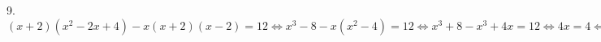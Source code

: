 9. $(x+2)(x^2-2x+4)-x(x+2)(x-2)=12\Leftrightarrow x^3-8-x(x^2-4)=12\Leftrightarrow x^3+8-x^3+4x=12\Leftrightarrow4x=4\Leftrightarrow x=1.$\\
